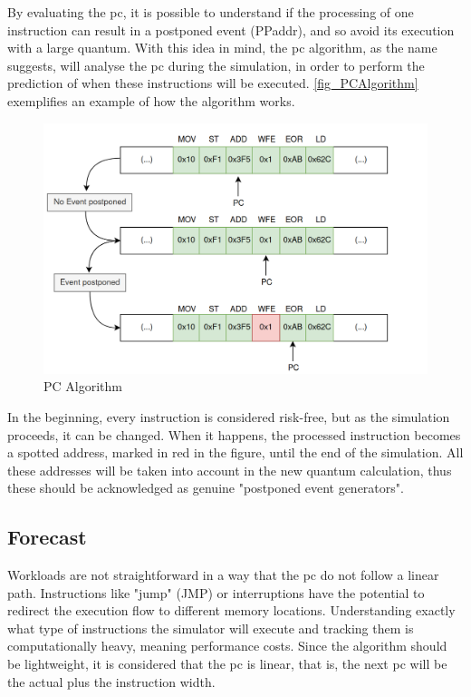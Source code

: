By evaluating the \gls{pc}, it is possible to understand if the processing of one instruction can result in a postponed event (PPaddr), and so 
avoid its execution with a large quantum. With this idea in mind, the \gls{pc} algorithm, as the name suggests, will analyse the \gls{pc} during 
the simulation, in order to perform the prediction of when these instructions will be executed. \autoref{fig_PCAlgorithm} exemplifies an example 
of how the algorithm works.

\begin{figure}[h!]
	\centering
 	\includegraphics[width=0.7\linewidth]{Images/PCAlgorithm.png}
 	\caption{PC Algorithm}
	 \label{fig_PCAlgorithm}
\end{figure}

In the beginning, every instruction is considered risk-free, but as the simulation proceeds, it can be changed. When it happens, the processed 
instruction becomes a spotted address, marked in red in the figure, until the end of the simulation. All these addresses will be taken into 
account in the new quantum calculation, thus these should be acknowledged as genuine "postponed event generators".





 
\subsection{Forecast}

Workloads are not straightforward in a way that the \gls{pc} do not follow a linear path. Instructions like "jump" (JMP) or interruptions 
have the potential to redirect the execution flow to different memory locations. Understanding exactly what type of instructions the simulator 
will execute and tracking them is computationally heavy, meaning performance costs. Since the algorithm should be lightweight, it is considered 
that the \gls{pc} is linear, that is, the next \gls{pc} will be the actual plus the instruction width. 

